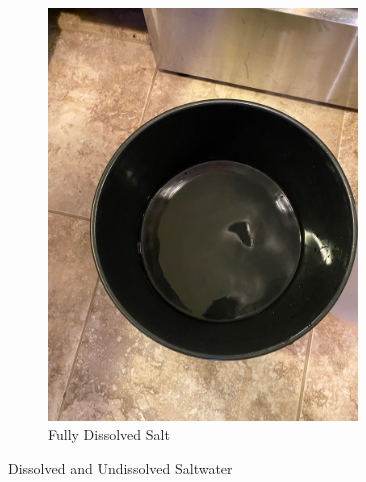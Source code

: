 \documentclass{report}
\begin{document}
\begin{enumerate}
\begin{figure}[H]
\begin{subfigure}{0.5\textwidth}
            \includegraphics[width=0.9\textwidth, angle=-90]{MixedWater.jpg}
            \caption{Fully Dissolved Salt}
        \end{subfigure}
        \caption{Dissolved and Undissolved Saltwater}
    \end{figure}
    

\end{enumerate}
\end{document}
